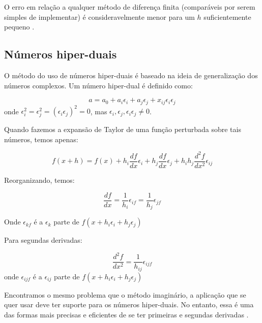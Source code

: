 O erro em relação a qualquer método de diferença finita (comparáveis por serem simples de implementar)
é consideravelmente menor para um \(h\) suficientemente pequeno \cite{caplan2011numerical}.

\subsection{Números hiper-duais}
\label{sec_hiper_dual}

\noindent
O método do uso de números hiper-duais \cite{Fike_2011} é baseado na ideia de generalização dos números complexos.
Um número hiper-dual é definido como:

\begin{equation}
a = a_0 + a_i\epsilon_i + a_j\epsilon_j + x_{ij}\epsilon_i \epsilon_j
\end{equation}
onde \(\epsilon_i^2 = \epsilon_j^2 = (\epsilon_i\epsilon_j)^2 = 0\), mas \( \epsilon_i, \epsilon_j, \epsilon_i\epsilon_j  \neq 0\).

Quando fazemos a expansão de Taylor de uma função perturbada sobre tais números, temos apenas:

\begin{equation}
f(x+ h) = f(x) + h_i \frac{df}{dx} \epsilon_i + h_j \frac{df}{dx} \epsilon_j +    h_ih_j \frac{d^2f}{dx^2} \epsilon_{ij}
\end{equation}

Reorganizando, temos:

\begin{equation}
  \frac{df}{dx} = \frac{1}{h_i} \epsilon_{if} = \frac{1}{h_j} \epsilon_{jf}
\end{equation}


Onde \(\epsilon_{kf}\) é a \(\epsilon_k\) parte de \( f(x + h_i\epsilon_i + h_j\epsilon_j) \)

Para segundas derivadas:

\begin{equation}
\frac{d^2f}{dx^2} = \frac{1}{h_{ij}} \epsilon_{ijf}
\end{equation}
onde \(\epsilon_{ijf}\) é a \(\epsilon_{ij}\) parte de \( f(x + h_i\epsilon_i + h_j\epsilon_j) \)

Encontramos o mesmo problema que o método imaginário, a aplicação que se quer usar deve ter
suporte para os números hiper-duais. No entanto, essa é uma das formas mais precisas e
eficientes de se ter primeiras e segundas derivadas \cite{Fike_2011}.